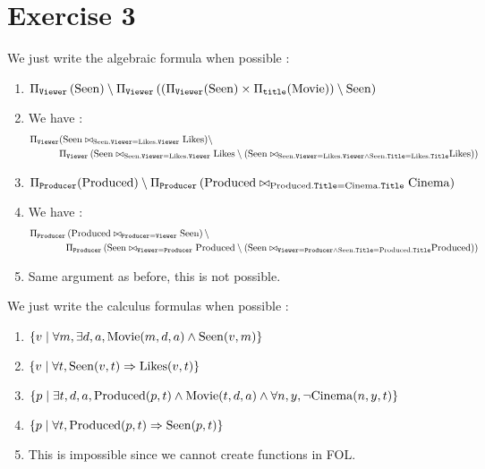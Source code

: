 \documentclass{cours}
\begin{document}
\section{Exercise 3}
We just write the algebraic formula when possible :
\begin{enumerate}
    \item
    $
        \Pi_{\tt Viewer}\left(\rm Seen\right) \setminus \Pi_{\tt Viewer}\left(\left(\Pi_{\tt Viewer}(\rm Seen) \times {\rm \Pi_{\tt title}(Movie)}\right) \setminus \rm Seen\right)
    $
    \item We have :  
    \[
    \begin{aligned}
        \Pi_{\tt Viewer}&({\rm Seen \bowtie_{\tt {\rm Seen}.Viewer = {\rm Likes}.Viewer} Likes}) \setminus\\ &\Pi_{\tt Viewer}\left(\rm Seen \bowtie_{\tt {\rm Seen}.Viewer = {\rm Likes}.Viewer} Likes \setminus \left({\rm Seen \bowtie_{\tt {\rm Seen}.Viewer = {\rm Likes}.Viewer \land {\rm Seen}.Title = {\rm Likes}.Title}} Likes\right)\right)    
    \end{aligned}    
    \]
    \item $\Pi_{\tt Producer}(\rm Produced)\setminus\Pi_{\tt Producer}\left(\rm Produced \bowtie_{\tt {\rm Produced}.Title = {\rm Cinema}.Title} Cinema\right)$
    \item We have : 
    \[
    \begin{aligned}
    \Pi_{\tt Producer}&\left(\rm Produced \bowtie_{\tt Producer = Viewer} Seen\right) \setminus \\ &\Pi_{\tt Producer}\left(\rm Seen \bowtie_{\tt Viewer = Producer} Produced \setminus \left({\rm Seen \bowtie_{\tt Viewer = Producer \land {\rm Seen}.Title = {\rm Produced}.Title}} Produced\right)\right)
    \end{aligned}
    \]
    \item Same argument as before, this is not possible. 
\end{enumerate}

We just write the calculus formulas when possible : 
\begin{enumerate}
    \item $\left\{v \mid \forall m, \exists d, a, {\rm Movie}(m, d, a) \land {\rm Seen}(v, m)\right\}$
    \item $\left\{v \mid \forall t, {\rm Seen}(v, t) \Rightarrow {\rm Likes}(v, t)\right\}$
    \item $\left\{p \mid \exists t, d, a, {\rm Produced}(p, t) \land {\rm Movie}(t, d, a) \land \forall n, y, \lnot {\rm Cinema}(n, y, t)\right\}$
    \item $\left\{p \mid \forall t, {\rm Produced}(p, t) \Rightarrow {\rm Seen}(p, t)\right\}$
    \item This is impossible since we cannot create functions in FOL.
\end{enumerate}
\end{document}
